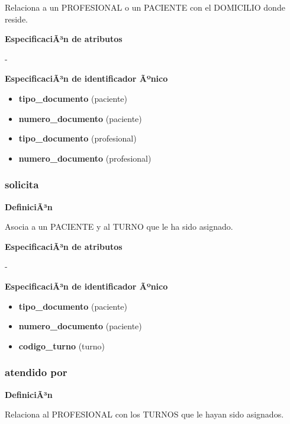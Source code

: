 \documentclass[a4paper,11pt]{article}
\begin{document}
Relaciona a un PROFESIONAL o un PACIENTE con el DOMICILIO donde reside.

\textbf{EspecificaciÃ³n de atributos}

-

\textbf{EspecificaciÃ³n de identificador Ãºnico}

\begin{itemize}

     \item \textbf{tipo\_documento} (paciente)

     \item \textbf{numero\_documento} (paciente)

     \item \textbf{tipo\_documento} (profesional)

     \item \textbf{numero\_documento} (profesional)

\end{itemize}

\subsubsection{\textbf{solicita}}

\textbf{DefiniciÃ³n}

Asocia a un PACIENTE y al TURNO que le ha sido asignado.

\textbf{EspecificaciÃ³n de atributos}

-

\textbf{EspecificaciÃ³n de identificador Ãºnico}

\begin{itemize}

     \item \textbf{tipo\_documento} (paciente)

     \item \textbf{numero\_documento} (paciente)

     \item \textbf{codigo\_turno} (turno)

\end{itemize}

\subsubsection{\textbf{atendido por}}

\textbf{DefiniciÃ³n}

Relaciona al PROFESIONAL con los TURNOS que le hayan sido asignados.
\end{document}
